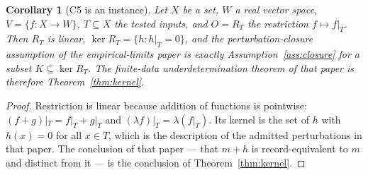 \documentclass[11pt]{article}
\newtheorem{corollary}[definition]{Corollary}
\theoremstyle{definition}
\begin{document}
\begin{corollary}[C5 is an instance]
\label{cor:c5}
Let $X$ be a set, $W$ a real vector space, $V=\{f:X\to W\}$, $T\subseteq X$ the
tested inputs, and $O=R_T$ the restriction $f\mapsto f|_T$. Then $R_T$ is
linear, $\ker R_T=\{h: h|_T=0\}$, and the perturbation-closure assumption of the
empirical-limits paper is exactly Assumption~\ref{ass:closure} for a subset
$K\subseteq\ker R_T$. The finite-data underdetermination theorem of that paper
is therefore Theorem~\ref{thm:kernel}.
\end{corollary}
\begin{proof}
Restriction is linear because addition of functions is pointwise:
$(f+g)|_T=f|_T+g|_T$ and $(\lambda f)|_T=\lambda(f|_T)$. Its kernel is the set
of $h$ with $h(x)=0$ for all $x\in T$, which is the description of the admitted
perturbations in that paper. The conclusion of that paper --- that $m+h$ is
record-equivalent to $m$ and distinct from it --- is the conclusion of
Theorem~\ref{thm:kernel}.
\end{proof}
\end{document}

